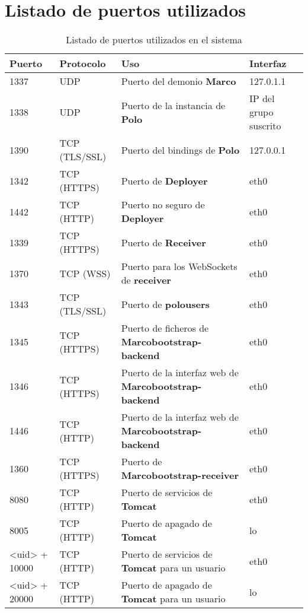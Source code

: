 \chapter{Listado de puertos utilizados}

\begin{table}[H]
\centering
\begin{tabular}{|p{1.5cm}|l|p{7.5cm}|p{2cm}|}\hline
\textbf{Puerto}&\textbf{Protocolo}&\textbf{Uso}&\textbf{Interfaz}\\
\hline
1337&UDP&Puerto del demonio \textbf{Marco}&127.0.1.1\\
\hline
1338&UDP&Puerto de la instancia de \textbf{Polo}&IP del grupo suscrito\\
\hline
1390&TCP (TLS/SSL)&Puerto del bindings de \textbf{Polo}&127.0.0.1\\
\hline
1342&TCP (HTTPS)&Puerto de \textbf{Deployer}&eth0\\
\hline
1442&TCP (HTTP)&Puerto no seguro de \textbf{Deployer}&eth0\\
\hline
1339&TCP (HTTPS)&Puerto de \textbf{Receiver}&eth0\\
\hline
1370&TCP (WSS)&Puerto para los WebSockets de \textbf{receiver}&eth0\\
\hline
1343&TCP (TLS/SSL)&Puerto de \textbf{polousers}&eth0\\
\hline
1345&TCP (HTTPS)&Puerto de ficheros de \textbf{Marcobootstrap-backend}&eth0\\
\hline
1346&TCP (HTTPS)&Puerto de la interfaz web de \textbf{Marcobootstrap-backend}&eth0\\
\hline
1446&TCP (HTTP)&Puerto de la interfaz web de \textbf{Marcobootstrap-backend}&eth0\\
\hline
1360&TCP (HTTPS)&Puerto de \textbf{Marcobootstrap-receiver}&eth0\\
\hline
8080&TCP (HTTP)&Puerto de servicios de \textbf{Tomcat}&eth0\\
\hline
8005&TCP (HTTP)&Puerto de apagado de \textbf{Tomcat}&lo\\
\hline
<uid> + 10000&TCP (HTTP)&Puerto de servicios de \textbf{Tomcat} para un usuario&eth0\\
\hline
<uid> + 20000&TCP (HTTP)&Puerto de apagado de \textbf{Tomcat} para un usuario&lo\\
\hline
\end{tabular}
\caption{Listado de puertos utilizados en el sistema}
\label{ports}
\end{table}